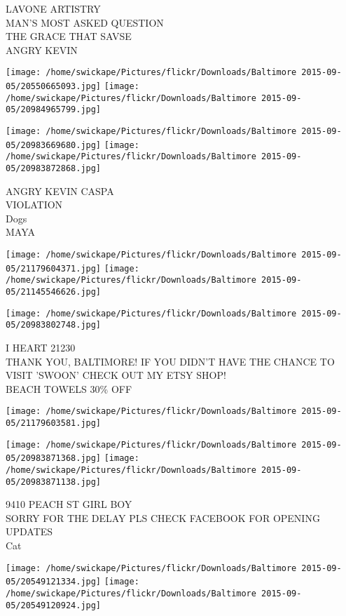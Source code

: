 \documentclass[10pt,letterpaper]{article}
\begin{document}
LAVONE ARTISTRY\\
MAN'S MOST ASKED QUESTION\\
THE GRACE THAT SAVSE\\
ANGRY KEVIN
\pagebreak

\texttt{[image: /home/swickape/Pictures/flickr/Downloads/Baltimore 2015-09-05/20550665093.jpg]}
\texttt{[image: /home/swickape/Pictures/flickr/Downloads/Baltimore 2015-09-05/20984965799.jpg]}

\texttt{[image: /home/swickape/Pictures/flickr/Downloads/Baltimore 2015-09-05/20983669680.jpg]}
\texttt{[image: /home/swickape/Pictures/flickr/Downloads/Baltimore 2015-09-05/20983872868.jpg]}

ANGRY KEVIN CASPA\\
VIOLATION\\
Dogs\\
MAYA
\pagebreak

\texttt{[image: /home/swickape/Pictures/flickr/Downloads/Baltimore 2015-09-05/21179604371.jpg]}
\texttt{[image: /home/swickape/Pictures/flickr/Downloads/Baltimore 2015-09-05/21145546626.jpg]}

\texttt{[image: /home/swickape/Pictures/flickr/Downloads/Baltimore 2015-09-05/20983802748.jpg]}

I HEART 21230\\
THANK YOU, BALTIMORE!  IF YOU DIDN'T HAVE THE CHANCE TO VISIT 'SWOON' CHECK OUT MY ETSY SHOP!\\
BEACH TOWELS 30\% OFF
\pagebreak

\texttt{[image: /home/swickape/Pictures/flickr/Downloads/Baltimore 2015-09-05/21179603581.jpg]}

\vspace{0.25in}
\texttt{[image: /home/swickape/Pictures/flickr/Downloads/Baltimore 2015-09-05/20983871368.jpg]}
\texttt{[image: /home/swickape/Pictures/flickr/Downloads/Baltimore 2015-09-05/20983871138.jpg]}

9410 PEACH ST GIRL BOY\\
SORRY FOR THE DELAY PLS CHECK FACEBOOK FOR OPENING UPDATES\\
Cat
\pagebreak

\texttt{[image: /home/swickape/Pictures/flickr/Downloads/Baltimore 2015-09-05/20549121334.jpg]}
\texttt{[image: /home/swickape/Pictures/flickr/Downloads/Baltimore 2015-09-05/20549120924.jpg]}
\end{document}
